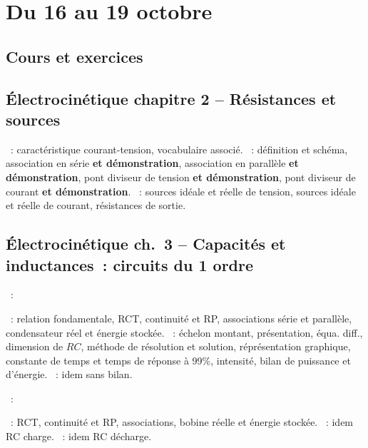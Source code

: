 \documentclass[a4paper, 12pt, final, garamond]{book}
\begin{document}
\setcounter{chapter}{4}

\chapter{Du 16 au 19 octobre}

\section{Cours et exercices}

\section*{Électrocinétique chapitre 2 -- Résistances et sources}
\begin{enumerate}[label=\Roman*]
	~: caractéristique courant-tension,
	vocabulaire associé.
	~: définition et schéma, association en série
	\textbf{et démonstration}, association en parallèle \textbf{et
		démonstration}, pont diviseur de tension \textbf{et démonstration}, pont
	diviseur de courant \textbf{et démonstration}.
	~: sources idéale et réelle de tension, sources idéale
	et réelle de courant, résistances de sortie.
\end{enumerate}

\section*{Électrocinétique ch.\ 3 -- Capacités et inductances~: circuits du
  1\ier{} ordre}
\begin{enumerate}[label=\Roman*]
	~:
	\begin{enumerate}[label=\Alph*]
		~: relation fondamentale, RCT, continuité et
		RP, associations série et parallèle, condensateur réel et énergie stockée.
		~: échelon montant, présentation, équa.
		diff., dimension de $RC$, méthode de résolution et solution, réprésentation
		graphique, constante de temps et temps de réponse à 99\%, intensité, bilan de
		puissance et d'énergie.
		~: idem sans bilan.
	\end{enumerate}
	~:
	\begin{enumerate}[label=\Alph*]
		~: RCT, continuité et RP, associations, bobine
		réelle et énergie stockée.
		~: idem RC charge.
		~: idem RC décharge.
	\end{enumerate}
\end{enumerate}
\end{document}
